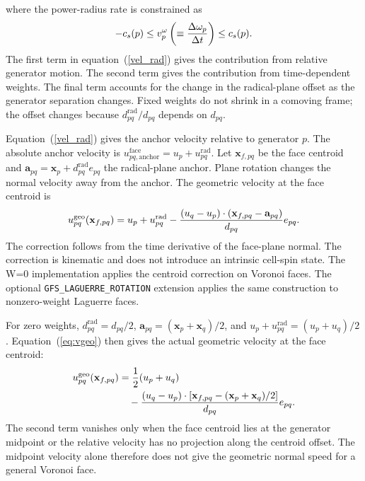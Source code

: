 \documentclass[twocolumn]{aastex63}
\newcommand{\vel}{{u}}
\newcommand{\vect}[1]{\mathbf{#1}}
\begin{document}
where the power-radius rate is constrained as
\begin{equation}
	-c_s(p)\le  v_{p}^\omega \left(\equiv {\Delta\omega_p \over \Delta t}\right) \le c_s(p).
\end{equation}
The first term in equation~(\ref{vel_rad}) gives the contribution from
relative generator motion. The second term gives the contribution from
time-dependent weights. The final term accounts for the change in the
radical-plane offset as the generator separation changes. Fixed weights do
not shrink in a comoving frame; the offset changes because
$d_{pq}^\textrm{rad}/d_{pq}$ depends on $d_{pq}$.


Equation~(\ref{vel_rad}) gives the anchor velocity relative to generator
$p$. The absolute anchor velocity is
$\vel_{pq,\mathrm{anchor}}^\textrm{face}=\vel_p+\vel_{pq}^\textrm{rad}$.
Let $\vect{x}_{f,pq}$ be the face centroid and
$\vect{a}_{pq}=\vect{x}_p+d_{pq}^\textrm{rad}e_{pq}$ the radical-plane
anchor. Plane rotation changes the normal velocity away from the anchor. The
geometric velocity at the face centroid is
\begin{equation}\label{eq:vgeo_general}
  \vel_{pq}^{\rm geo}(\vect{x}_{f,pq})
  =\vel_p+\vel_{pq}^\textrm{rad}
   -{(\vel_q-\vel_p)\cdot(\vect{x}_{f,pq}-\vect{a}_{pq})\over d_{pq}}e_{pq}.
\end{equation}
The correction follows from the time derivative of the face-plane normal.
The correction is kinematic and does not introduce an intrinsic cell-spin
state. The W=0 implementation applies the centroid correction on Voronoi
faces. The optional \texttt{GFS\_LAGUERRE\_ROTATION} extension applies the
same construction to nonzero-weight Laguerre faces.

For zero weights, $d_{pq}^\textrm{rad}=d_{pq}/2$,
$\vect{a}_{pq}=(\vect{x}_p+\vect{x}_q)/2$, and
$\vel_p+\vel_{pq}^\textrm{rad}=(\vel_p+\vel_q)/2$. Equation~(\ref{eq:vgeo})
then gives the actual geometric velocity at the face centroid:
\begin{equation}
  \begin{aligned}
  \vel_{pq}^{\rm geo}(\vect{x}_{f,pq})
  &={1\over2}(\vel_p+\vel_q)\\
  &\quad-{(\vel_q-\vel_p)\cdot
      [\vect{x}_{f,pq}-(\vect{x}_p+\vect{x}_q)/2]\over d_{pq}}e_{pq}.
  \end{aligned}
  \label{eq:vgeo}
\end{equation}
The second term vanishes only when the face centroid lies at the generator
midpoint or the relative velocity has no projection along the centroid
offset. The midpoint velocity alone therefore does not give the geometric
normal speed for a general Voronoi face.
\end{document}
